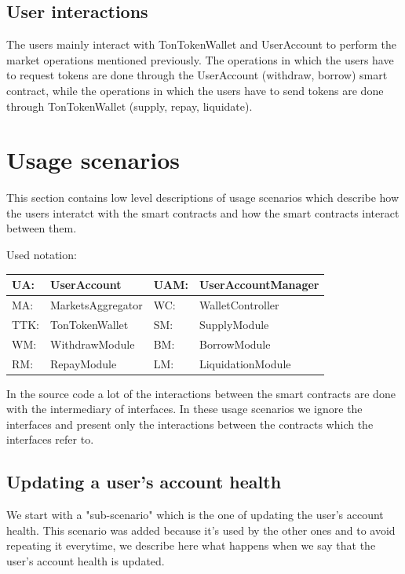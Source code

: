 \subsection{User interactions}

The users mainly interact with TonTokenWallet and UserAccount to perform the market operations mentioned previously. The operations in which the users have to request tokens are done through the UserAccount (withdraw, borrow) smart contract, while the operations in which the users have to send tokens are done through TonTokenWallet (supply, repay, liquidate). %

\section{Usage scenarios}

This section contains low level descriptions of usage scenarios which describe how the users interatct with the smart contracts and how the smart contracts interact between them.

Used notation:

\begin{tabularx}{\textwidth}{|l X|l X|} \hline
  UA: & UserAccount &         UAM: & UserAccountManager \\\hline
  MA: & MarketsAggregator &   WC: & WalletController \\\hline
  TTK: & TonTokenWallet &     SM: & SupplyModule \\\hline
  WM: & WithdrawModule &      BM: & BorrowModule \\\hline
  RM: & RepayModule &         LM: & LiquidationModule \\\hline
\end{tabularx}

In the source code a lot of the interactions between the smart contracts are done with the intermediary of interfaces. In these usage scenarios we ignore the interfaces and present only the interactions between the contracts which the interfaces refer to.

\subsection{Updating a user's account health}
We start with a "sub-scenario" which is the one of updating the user's account health. This scenario was added because it's used by the other ones and to avoid repeating it everytime, we describe here what happens when we say that the user's account health is updated.

